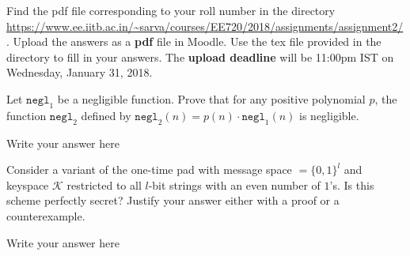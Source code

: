 \documentclass[12pt,a4paper,answers]{exam}
\begin{document}
\pagestyle{head}
\headrule
{}
%

\extraheadheight{.4in}%
\extrafootheight{-0.5in}%
\extrawidth{0.5in}%

Find the pdf file corresponding to your roll number in the directory \url{https://www.ee.iitb.ac.in/~sarva/courses/EE720/2018/assignments/assignment2/}. Upload the answers as a \textbf{pdf} file in Moodle. Use the tex file provided in the directory to fill in your answers. The \textbf{upload deadline} will be 11:00pm IST on Wednesday, January 31, 2018.
\begin{questions}
\question[5] Let $\texttt{negl}_1$ be a negligible function. Prove that for any positive polynomial $p$, the function $\texttt{negl}_2$ defined by $\texttt{negl}_2(n) = p(n) \cdot \texttt{negl}_1(n)$ is negligible.
  \begin{solution}
    Write your answer here
  \end{solution}
 
\question[5] Consider a variant of the one-time pad with message space $\mathcal = \{0,1\}^l$ and keyspace $\mathcal{K}$ restricted to all $l$-bit strings with an even number of $1$'s. Is this scheme perfectly secret? Justify your answer either with a proof or a counterexample.
  \begin{solution}
    Write your answer here
  \end{solution}

  
\end{questions}
\end{document}

